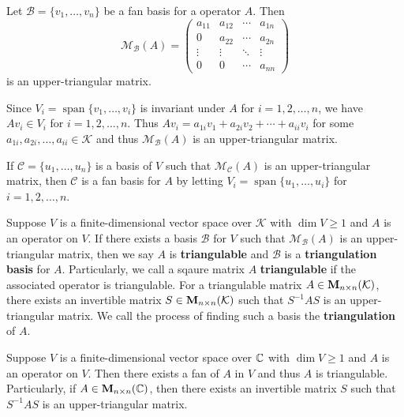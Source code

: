 \begin{theoremenv}
    Let $\mathcal{B} = \{v_1, \ldots, v_n\}$ be a fan basis for a operator $A$. Then $$\mathcal{M}_\mathcal{B} (A) = \begin{pmatrix}
        a_{11} & a_{12} & \cdots & a_{1n} \\
        0 & a_{22} & \cdots & a_{2n} \\
        \vdots & \vdots & \ddots & \vdots \\
        0 & 0 & \cdots & a_{nn}
    \end{pmatrix}$$ is an upper-triangular matrix.
\end{theoremenv}
\begin{proofenv}
    Since $V_i = \operatorname{span}\{ v_1, \ldots, v_i \}$ is invariant under $A$ for $i=1,2,\ldots,n$, we have $A v_i \in V_i$ for $i=1,2,\ldots,n$. Thus $A v_i = a_{1i} v_1 + a_{2i} v_2 + \cdots + a_{ii} v_i$ for some $a_{1i}, a_{2i}, \ldots, a_{ii} \in \mathcal K$ and thus $\mathcal{M}_\mathcal{B}(A)$ is an upper-triangular matrix.
\end{proofenv}
\begin{remarkenv}
    If $\mathcal C = \{ u_1, \ldots, u_n \}$ is a basis of $V$ such that $\mathcal M_\mathcal{C}(A)$ is an upper-triangular matrix, then $\mathcal C$ is a fan basis for $A$ by letting $V_i = \operatorname{span} \{ u_1, \ldots, u_i \}$ for $i=1,2,\ldots,n$.
\end{remarkenv}
\begin{definitionenv}
    Suppose $V$ is a finite-dimensional vector space over $\mathcal K$ with $\dim V\ge 1$ and $A$ is an operator on $V$. If there exists a basis $\mathcal{B}$ for $V$ such that $\mathcal M_\mathcal{B}(A)$ is an upper-triangular matrix, then we say $A$ is \textbf{triangulable} and $\mathcal{B}$ is a \textbf{triangulation basis} for $A$. Particularly, we call a sqaure matrix $A$ \textbf{triangulable} if the associated operator is triangulable. For a triangulable matrix $A\in \mathbf{M}_{n\times n}(\mathcal K)$, there exists an invertible matrix $S \in \mathbf{M}_{n\times n}(\mathcal K)$ such that $S^{-1} A S$ is an upper-triangular matrix. We call the process of finding such a basis the \textbf{triangulation} of $A$.
\end{definitionenv}
\begin{theoremenv}
    Suppose $V$ is a finite-dimensional vector space over $\mathbb{C}$ with $\dim V\ge 1$ and $A$ is an operator on $V$. Then there exists a fan of $A$ in $V$ and thus $A$ is triangulable. Particularly, if $A\in \mathbf{M}_{n\times n}(\mathbb{C})$, then there exists an invertible matrix $S$ such that $S^{-1} A S$ is an upper-triangular matrix.
\end{theoremenv}
